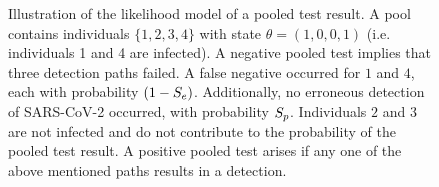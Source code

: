 \documentclass{article}
\begin{document}
\begin{figure}[H]
  \centering
  \caption{Illustration of the likelihood model of a pooled test
    result. A pool contains individuals $\{1,2,3,4\}$ with state
    $\theta=(1,0,0,1)$ (i.e. individuals 1 and 4 are infected). A
    negative pooled test implies that three detection paths failed. A
    false negative occurred for $1$ and $4$, each with probability
    $(1-S_e)$. Additionally, no erroneous detection of SARS-CoV-2
    occurred, with probability $S_p$. Individuals $2$ and $3$ are
    not infected and do not contribute to the probability of the
    pooled test result. A positive pooled test arises if any one of
    the above mentioned paths results in a
    detection.}\label{fig:likelihood}
\end{figure}
\end{document}
